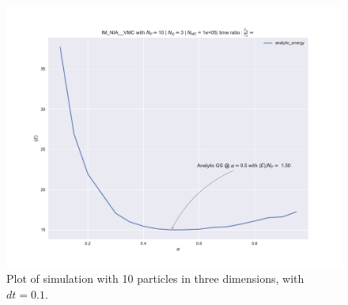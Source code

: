 \begin{figure}
\hspace{-2.8cm}
\includegraphics[width = \paperwidth]{figures/c_figs/IM_NIA_np_10_nd_3_dt_01_check.pdf}
\caption{Plot of simulation with 10 particles in three dimensions, with $dt = 0.1$.}
\label{fig:1c_dt01}
\end{figure}

